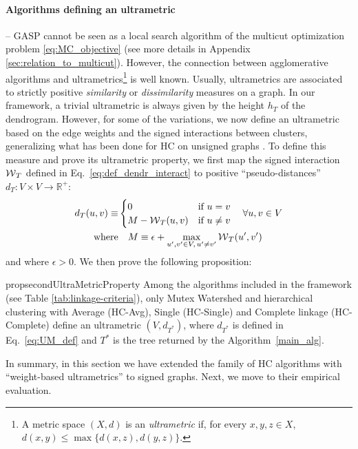 \paragraph{Algorithms defining an ultrametric} -- 
GASP cannot be seen as a local search algorithm of the multicut optimization problem \ref{eq:MC_objective} (see more details in Appendix \ref{sec:relation_to_multicut}).
However, the connection between agglomerative algorithms and ultrametrics\footnote{A metric space $(X,d)$ is an \emph{ultrametric} if, for every $x,y,z \in X$, $d(x,y)\leq \max \{d(x,z), d(y,z)\}$.} is well known. Usually, ultrametrics are associated to strictly positive \emph{similarity} or \emph{dissimilarity} measures on a graph. In our framework, a trivial ultrametric is always given by the height $h_T$ of the dendrogram. However, for some of the \algname{} variations, we now define an ultrametric based on the edge weights and the signed interactions between clusters, generalizing what has been done for HC on unsigned graphs \cite{johnson1967hierarchical,milligan1979ultrametric}. To define this measure and prove its ultrametric property, we first map the signed interaction $\mathcal{W}{}_{T}{}$ defined in Eq.~\ref{eq:def_dendr_interact} to positive ``pseudo-distances'' $d_{T}:V \times V \rightarrow \mathbb{R}^{+}$:
\begin{align}\label{eq:UM_def}
d_{T}(u,v)\equiv &\begin{cases}
0 & \text{if}\,\, u=v\\
M-\mathcal{W}{}_{T}(u,v) & \text{if}\,\, u\neq v
\end{cases}\quad \forall u,v\in V\\
\mathrm{where}& \quad  M \equiv  \epsilon + \max_{u',v'\in V,\,u'\neq v'}\mathcal{W}{}_{T}(u',v')
\end{align}
and where $\epsilon > 0$. 
We then prove the following proposition:
\begin{restatable}{prop}{secondUltraMetricProperty}
\label{prop:ultraMetric2}
Among the algorithms included in the \algname{} framework (see Table \ref{tab:linkage-criteria}), only Mutex Watershed and hierarchical clustering with Average (HC-Avg), Single (HC-Single) and Complete linkage (HC-Complete) define an ultrametric $(V, d_{T^*})$, where $d_{T^*}$ is defined in Eq.~\ref{eq:UM_def} and $T^*$ is the tree returned by the \algname{} Algorithm~\ref{main_alg}.
\end{restatable}
\noindent In summary, in this section we have extended the family of HC algorithms \cite{johnson1967hierarchical,milligan1979ultrametric} with ``weight-based ultrametrics'' to signed graphs. Next, we move to their empirical evaluation. 




